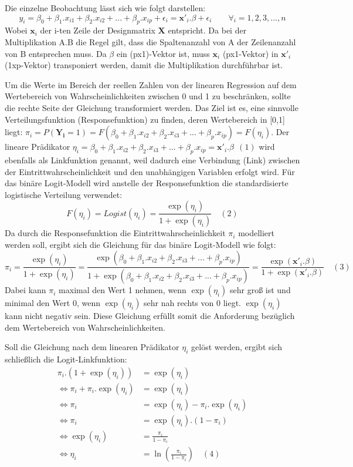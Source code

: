 \documentclass[12pt,]{article}
\begin{document}
Die einzelne Beobachtung lässt sich wie folgt darstellen: \[
y_i = \beta_0 + \beta_1.x_{i1} + \beta_2.x_{i2} + ... + \beta_p.x_{ip} + \epsilon_i = \mathbf{x'}_i.\beta + \epsilon_i \qquad \forall_i = 1,2,3,...,n
\] Wobei \(\mathbf{x}_i\) der i-ten Zeile der Designmatrix
\(\mathbf{X}\) entspricht. Da bei der Multiplikation A.B die Regel gilt,
dass die Spaltenanzahl von A der Zeilenanzahl von B entsprechen muss. Da
\(\beta\) ein (px1)-Vektor ist, muss \(\mathbf{x}_i\) (px1-Vektor) in
\(\mathbf{x'}_i\) (1xp-Vektor) transponiert werden, damit die
Multiplikation durchführbar ist.

Um die Werte im Bereich der reellen Zahlen von der linearen Regression
auf dem Wertebereich von Wahrscheinlichkeiten zwischen 0 und 1 zu
beschränken, sollte die rechte Seite der Gleichung transformiert werden.
Das Ziel ist es, eine sinnvolle Verteilungsfunktion (Responsefunktion)
zu finden, deren Wertebereich in {[}0,1{]} liegt:
\(\pi_i = P(\mathbf{Y_i} = 1) = F(\beta_0 + \beta_1.x_{i2} + \beta_2.x_{i3} + ... + \beta_p.x_{ip}) = F(\eta_i)\).
Der lineare Prädikator
\(\eta_i = \beta_0 + \beta_1.x_{i2} + \beta_2.x_{i3} + ... + \beta_p.x_{ip} = \mathbf{x'}_i.\beta \ \ (1)\)
wird ebenfalls als Linkfunktion genannt, weil dadurch eine Verbindung
(Link) zwischen der Eintrittwahrscheinlichkeit und den unabhängigen
Variablen erfolgt wird. Für das binäre Logit-Modell wird anstelle der
Responsefunktion die standardisierte logistische Verteilung verwendet:
\[
F(\eta_i) = Logist(\eta_i) = \frac{\exp(\eta_i)}{1 + \exp(\eta_i)} \quad (2)
\] Da durch die Responsefunktion die Eintrittwahrscheinlichkeit
\(\pi_i\) modelliert werden soll, ergibt sich die Gleichung für das
binäre Logit-Modell wie folgt: \[
\pi_i = \frac{\exp(\eta_i)}{1 + \exp(\eta_i)} = \frac{\exp(\beta_0 + \beta_1.x_{i2} + \beta_2.x_{i3} + ... + \beta_p.x_{ip})}{1 + \exp(\beta_0 + \beta_1.x_{i2} + \beta_2.x_{i3} + ... + \beta_p.x_{ip})} = \frac{\exp(\mathbf{x'}_i.\beta)}{1+\exp(\mathbf{x'}_i.\beta)} \quad (3)
\] Dabei kann \(\pi_i\) maximal den Wert 1 nehmen, wenn \(\exp(\eta_i)\)
sehr groß ist und minimal den Wert 0, wenn \(\exp(\eta_i)\) sehr nah
rechts von 0 liegt. \(\exp(\eta_i)\) kann nicht negativ sein. Diese
Gleichung erfüllt somit die Anforderung bezüglich dem Wertebereich von
Wahrscheinlichkeiten.

Soll die Gleichung nach dem linearen Prädikator \(\eta_i\) gelöst
werden, ergibt sich schließlich die Logit-Linkfunktion: \[
\begin{aligned}
\pi_i.(1 + \exp(\eta_i)) &= \exp(\eta_i) \\
\Leftrightarrow \pi_i + \pi_i.\exp(\eta_i) &= \exp(\eta_i) \\
\Leftrightarrow \pi_i &= \exp(\eta_i) - \pi_i.\exp(\eta_i)  \\
\Leftrightarrow \pi_i &= \exp(\eta_i).(1-\pi_i) \\
\Leftrightarrow \exp(\eta_i) &= \frac{\pi_i}{1-\pi_i} \\
\Leftrightarrow \eta_i &= \ln(\frac{\pi_i}{1-\pi_i}) \quad (4)\\
\end{aligned} 
\]
\end{document}
